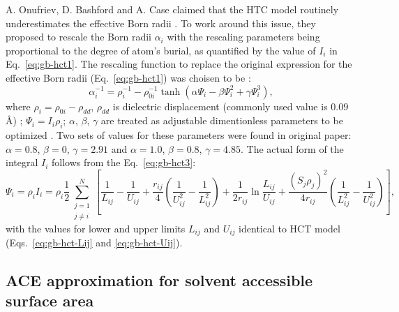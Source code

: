 \documentclass[11pt]{book}
\begin{document}
A. Onufriev, D. Bashford and A. Case claimed that the HTC model routinely underestimates the effective Born radii \cite{OnufrievJPC00,OnufrievProteins04}. To work around this issue, they proposed to rescale the Born radii $\alpha_{i}$ with the rescaling parameters being proportional to the degree of atom's burial, as quantified by the value of $I_{i}$ in Eq.~\ref{eq:gb-hct1}. The rescaling function to replace the original expression for the effective Born radii (Eq.~\ref{eq:gb-hct1}) was choisen to be \cite{OnufrievProteins04}:
\begin{equation}\label{eq:gb-obc1}
\alpha_{i}^{-1}=\rho_{i}^{-1}-\rho_{0i}^{-1}\tanh(\alpha\Psi_{i}-\beta\Psi_{i}^{2}+\gamma\Psi_{i}^{3}),
\end{equation}
where $\rho_{i}=\rho_{0i}-\rho_{dd}$, $\rho_{dd}$ is dielectric displacement (commonly used value is $0.09$\AA) \cite{StillJACS90,OnufrievProteins04}; $\Psi_{i}=I_{i}\rho_{i}$; $\alpha$, $\beta$, $\gamma$ are treated as adjustable dimentionless parameters to be optimized \cite{OnufrievProteins04}. Two sets of values for these parameters were found in original paper: $\alpha=0.8$, $\beta=0$, $\gamma=2.91$ and $\alpha=1.0$, $\beta=0.8$, $\gamma=4.85$. The actual form of the integral $I_{i}$ follows from the Eq.~\ref{eq:gb-hct3}:
\begin{equation}\label{eq:gb-obc2}
\Psi_{i}=\rho_{i}I_{i}=\rho_{i}\frac{1}{2}\sum_{\substack{j=1\\j\ne i}}^{N}\left[\frac{1}{L_{ij}}-\frac{1}{U_{ij}}+\frac{r_{ij}}{4}\left(\frac{1}{U_{ij}^{2}}-\frac{1}{L_{ij}^{2}}\right)+\frac{1}{2r_{ij}}\ln\frac{L_{ij}}{U_{ij}}+\frac{(S_{j}\rho_{j})^{2}}{4r_{ij}}\left(\frac{1}{L_{ij}^{2}}-\frac{1}{U_{ij}^{2}}\right)\right],
\end{equation}
with the values for lower and upper limits $L_{ij}$ and $U_{ij}$ identical to HCT model (Eqs.~\ref{eq:gb-hct-Lij} and \ref{eq:gb-hct-Uij}).


\subsection{ACE approximation for solvent accessible surface area}
\end{document}
